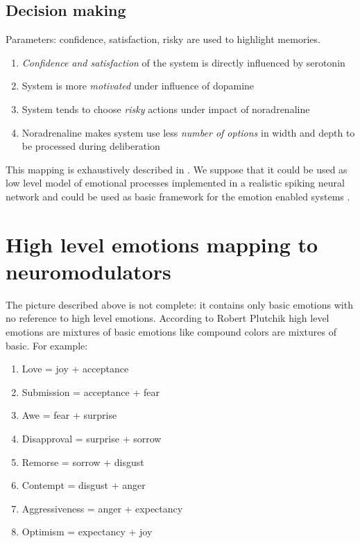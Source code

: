 \subsection{Decision making}

Parameters: confidence, satisfaction, risky are used to highlight memories.

\begin{enumerate}
 \item  \emph{Confidence and satisfaction} of the system is directly influenced by serotonin
 \item  System is more \emph{motivated} under influence of dopamine
 \item  System tends to choose \emph{risky} actions under impact of noradrenaline
 \item  Noradrenaline makes system use less \emph{number of options} in width and depth to be processed during deliberation
\end{enumerate}

This mapping is exhaustively described in \cite{computational_emotional_thinking}. We suppose that it could be used as low level model of emotional processes implemented in a realistic spiking neural network and could be used as basic framework for the emotion enabled systems \cite{whatdoesitmeanforcomputer, affectivecomputingchallanges}.

\section{High level emotions mapping to neuromodulators}

The picture described above is not complete: it contains only basic emotions with no reference to high level emotions. According to Robert Plutchik \cite{natureofemotions, senticcomputing, hourglass} high level emotions are mixtures of basic emotions like compound colors are mixtures of basic. For example:

\begin{enumerate}
 \item  Love = joy + acceptance
 \item  Submission = acceptance + fear
 \item  Awe = fear + surprise
 \item  Disapproval = surprise + sorrow
 \item  Remorse = sorrow + disgust
 \item  Contempt = disgust + anger
 \item  Aggressiveness = anger + expectancy
 \item  Optimism = expectancy + joy
\end{enumerate}


